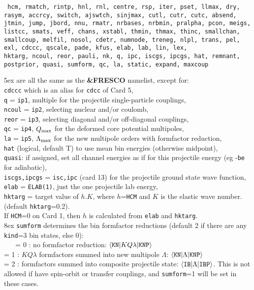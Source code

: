 \documentclass[11pt]{article}
\begin{document}
{\tt
hcm, rmatch, rintp, hnl, rnl, centre,  rsp, iter, pset, llmax,  dry,
rasym, accrcy, switch, ajswtch, sinjmax,  cutl, cutr, cutc,
absend, jtmin, jump, jbord, nnu,  rmatr, nrbases, nrbmin,  pralpha, pcon,  meigs,
listcc, smats, veff, chans, xstabl, thmin, thmax, thinc,
smallchan, smallcoup, melfil, nosol, cdetr, numnode, treneg,
nlpl, trans, pel, exl, cdccc, qscale, pade, kfus,
elab,  lab, lin, lex, \\

 hktarg, ncoul, reor, pauli,  nk,
q, ipc, iscgs, ipcgs,  hat, remnant, postprior, quasi,
sumform, qc, la, static, expand, maxcoup
}\\

\vspace{-3mm}

\hangindent 5ex
are all the same as the {\bf \&FRESCO} namelist, except for:\\
{\tt cdccc} which is an alias for {\tt cdcc} of Card 5,\\
{\tt q} = {\tt ip1}, multiple for the projectile single-particle couplings,\\
{\tt ncoul} = {\tt ip2}, selecting nuclear and/or coulomb,\\
{\tt reor} = {\tt ip3}, selecting diagonal and/or off-diagonal couplings,\\
{\tt qc} = {\tt ip4}, $Q_{\rm max}$ for the deformed core potential multipoles,\\
{\tt la} = {\tt ip5}, $\Lambda_{\rm max}$ for the new multipole orders with formfactor reduction,\\
{\tt hat} (logical, default T) to use mean bin energies (otherwise midpoint),\\
{\tt quasi}: if assigned, set all channel energies as if for this projectile
energy (eg -{\tt be} for adiabatic),\\
{\tt iscgs,ipcgs} = {\tt isc,ipc} (card 13) for the projectile ground state wave
function,\\
{\tt elab} = {\tt ELAB(1)}, just the one projectile lab energy,\\
{\tt hktarg} = target value of $h.K$, where $h$={\tt HCM} and $K$ is the elastic wave number.
(default {\tt hktarg}=0.2). \\
\hspace*{1cm} If {\tt HCM}=0 on Card 1,
then $h$ is calculated from {\tt elab} and {\tt hktarg}.\\



\hangindent 8ex
{\tt sumform} determines the bin formfactor reductions
(default 2 if there are any {\tt kind}=3 bin states, else 0):\\
~ ~   = 0 : no formfactor reduction:
     $\langle {\tt KN} | K Q \lambda | {\tt KNP} \rangle$
\\    = 1 : $KQ\lambda$ formfactors summed into new multipole $\Lambda$:
     $\langle {\tt KN} | \Lambda | {\tt KNP} \rangle$
\\    = 2 : formfactors summed into composite projectile state:
     $\langle {\tt IB} | {\Lambda} | {\tt IBP} \rangle$.
      This is not allowed if have spin-orbit or transfer couplings, and
      {\tt sumform}=1 will be set in these cases.\\
\end{document}
